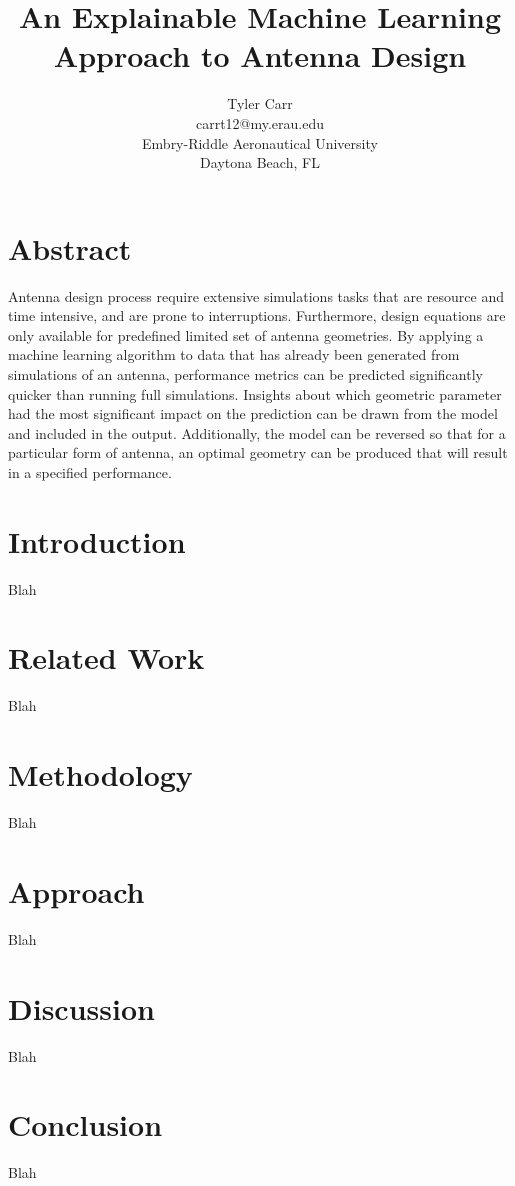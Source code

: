 \documentclass[11pt, notitlepage]{article}
\title{\textbf{An Explainable Machine Learning Approach to Antenna Design}}
\author{Tyler Carr \\ carrt12@my.erau.edu \\ Embry-Riddle Aeronautical University \\ Daytona Beach, FL}
\date{}
\begin{document}
\maketitle


\begin{multicols}{2}

\section*{Abstract}
Antenna design process require extensive simulations tasks that are resource and time intensive, and are prone to interruptions. Furthermore, design equations are only available for predefined limited set of antenna geometries. By applying a machine learning algorithm to data that has already been generated from simulations of an antenna, performance metrics can be predicted significantly quicker than running full simulations. Insights about which geometric parameter had the most significant impact on the prediction can be drawn from the model and included in the output. Additionally, the model can be reversed so that for a particular form of antenna, an optimal geometry can be produced that will result in a specified performance. 

\section{Introduction}
Blah

\section{Related Work}
Blah

\section{Methodology}
Blah

\section{Approach}
Blah

\section{Discussion}
Blah

\section{Conclusion}
Blah




\end{multicols}
\end{document}
